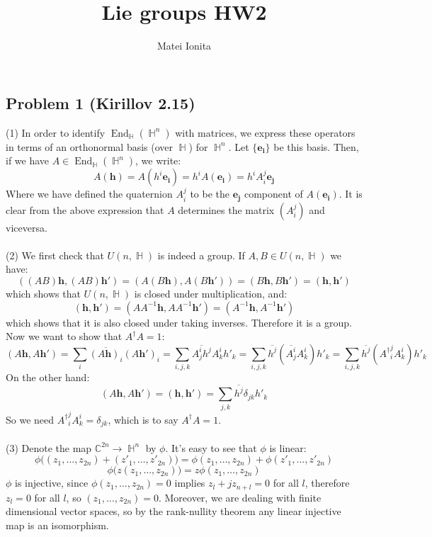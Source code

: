 \documentclass[12 pt]{article}
\title{Lie groups HW2}
\author{Matei Ionita}
\newcommand{\C}{\mathbb{C}}
\DeclareMathOperator {\HH} {\mathbb{H}}
\DeclareMathOperator {\End} {End}
\begin{document}
  \maketitle

\subsection*{Problem 1 (Kirillov 2.15)}
(1) In order to identify $\End_{\HH}(\HH^n)$ with matrices, we express these operators in terms of an orthonormal basis (over $\HH$) for $\HH^n$. Let $\{\mathbf{e_i}\}$ be this basis. Then, if we have $A\in \End_{\HH}(\HH^n)$, we write:
\[      A (\mathbf{h}) = A(h^i \mathbf{e_i}) = h^i A(\mathbf{e_i})  = h^i A_i^j \mathbf{e_j}  \]
Where we have defined the quaternion $A_i^j$ to be the $\mathbf{e_j}$ component of $A(\mathbf{e_i})$. It is clear from the above expression that $A$ determines the matrix $(A_i^j)$ and viceversa.
\\
\\
(2) We first check that $U(n, \HH)$ is indeed a group. If $A,B \in U(n, \HH)$ we have:
\[      ((AB) \mathbf{h} , (AB) \mathbf{h'} ) =  (A (B \mathbf{h}) , A(B \mathbf{h'}) )  = (B \mathbf{h} , B \mathbf{h'} ) = ( \mathbf{h} ,  \mathbf{h'} )    \]
which shows that $U(n, \HH)$ is closed under multiplication, and:
\[       ( \mathbf{h} ,  \mathbf{h'} )  = ( A A^{-1}\mathbf{h} ,  AA^{-1}\mathbf{h'} )  = (A^{-1} \mathbf{h} , A^{-1} \mathbf{h'} )        \]
which shows that it is also closed under taking inverses. Therefore it is a group. Now we want to show that $A^{\dagger}A = 1$:
\[     (A\mathbf{h} , A \mathbf{h'}) = \sum_i \overline{(A\mathbf{h})_i}  (A\mathbf{h'})_i  = \sum_{i,j,k} \overline{A^i_j h^j} A^i_k h'_k = \sum_{i,j,k} \overline{h^j} (\overline{A^i_j} A^i_k )h'_k = \sum_{i,j,k} \overline{h^j} ({A^{\dagger}}^j_i A^i_k )h'_k \]
On the other hand:
\[       (A\mathbf{h} , A \mathbf{h'}) =  (\mathbf{h} , \mathbf{h'}) = \sum_{j,k} \overline{h^j} \delta_{jk} h'_k    \]
So we need ${A^{\dagger}}^j_i A^i_k = \delta_{jk}$, which is to say $A^{\dagger}A = 1$.
\\
\\
(3) Denote the map $\C^{2n} \to \HH^n$ by $\phi$. It's easy to see that $\phi$ is linear:
\[   \phi\big( (z_1, \dots , z_{2n}) +(z'_1, \dots , z'_{2n}) \big) = \phi (z_1, \dots , z_{2n}) + \phi (z'_1, \dots , z'_{2n}) \]
\[    \phi\big( z (z_1, \dots , z_{2n})  \big)  = z \phi (z_1, \dots , z_{2n})  \]
$\phi$ is injective, since $\phi(z_1, \dots , z_{2n}) = 0$ implies $z_l + j z_{n+l} = 0$ for all $l$, therefore $z_l = 0$ for all $l$, so $(z_1, \dots , z_{2n}) = 0$. Moreover, we are dealing with finite dimensional vector spaces, so by the rank-nullity theorem any linear injective map is an isomorphism.
\end{document}
